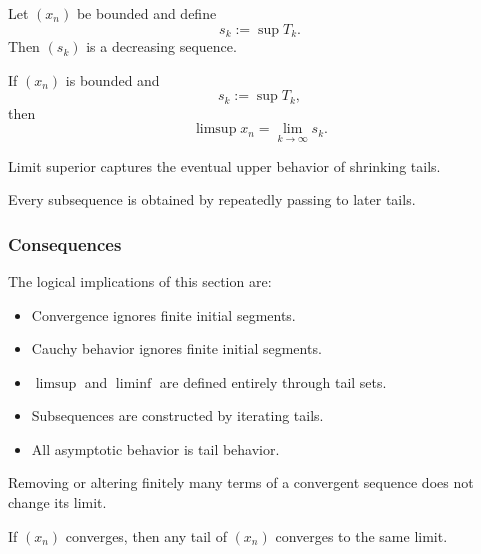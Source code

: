 \begin{theorem}
Let $(x_n)$ be bounded and define
\[
s_k := \sup T_k.
\]
Then $(s_k)$ is a decreasing sequence.
\end{theorem}



\begin{theorem}
If $(x_n)$ is bounded and
\[
s_k := \sup T_k,
\]
then
\[
\limsup x_n = \lim_{k\to\infty} s_k.
\]
\end{theorem}

\begin{remark}
Limit superior captures the eventual upper behavior of
shrinking tails.
\end{remark}

\begin{theorem}
Every subsequence is obtained by repeatedly passing to
later tails.
\end{theorem}



\subsubsection{Consequences}

The logical implications of this section are:

\begin{itemize}
\item Convergence ignores finite initial segments.
\item Cauchy behavior ignores finite initial segments.
\item $\limsup$ and $\liminf$ are defined entirely through tail sets.
\item Subsequences are constructed by iterating tails.
\item All asymptotic behavior is tail behavior.
\end{itemize}

\begin{corollary}
Removing or altering finitely many terms of a convergent sequence
does not change its limit.
\end{corollary}

\begin{corollary}
If $(x_n)$ converges, then any tail of $(x_n)$ converges to the same limit.
\end{corollary}

